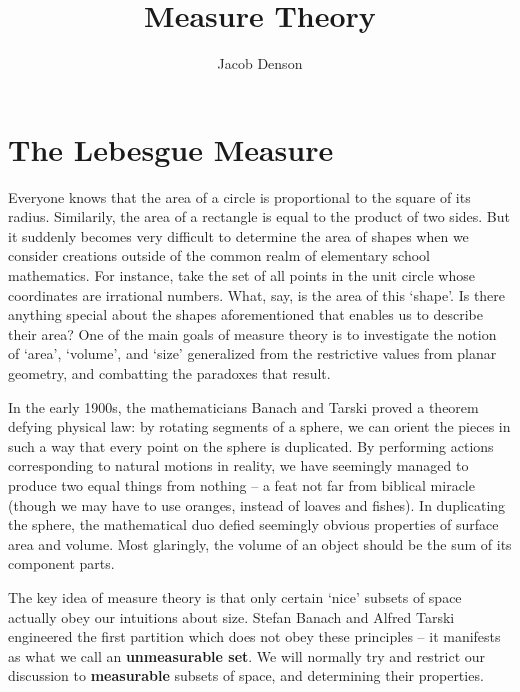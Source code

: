 

\title{Measure Theory}
\author{Jacob Denson}




\maketitle

\tableofcontents


\chapter{The Lebesgue Measure}

Everyone knows that the area of a circle is proportional to the square of its radius. Similarily, the area of a rectangle is equal to the product of two sides. But it suddenly becomes very difficult to determine the area of shapes when we consider creations outside of the common realm of elementary school mathematics. For instance, take the set of all points in the unit circle whose coordinates are irrational numbers. What, say, is the area of this `shape'. Is there anything special about the shapes aforementioned that enables us to describe their area? One of the main goals of measure theory is to investigate the notion of `area', `volume', and `size' generalized from the restrictive values from planar geometry, and combatting the paradoxes that result.

In the early 1900s, the mathematicians Banach and Tarski proved a theorem defying physical law: by rotating segments of a sphere, we can orient the pieces in such a way that every point on the sphere is duplicated. By performing actions corresponding to natural motions in reality, we have seemingly managed to produce two equal things from nothing -- a feat not far from biblical miracle (though we may have to use oranges, instead of loaves and fishes). In duplicating the sphere, the mathematical duo defied seemingly obvious properties of surface area and volume. Most glaringly, the volume of an object should be the sum of its component parts.

The key idea of measure theory is that only certain `nice' subsets of space actually obey our intuitions about size. Stefan Banach and Alfred Tarski engineered the first partition which does not obey these principles -- it manifests as what we call an {\bf unmeasurable set}. We will normally try and restrict our discussion to {\bf measurable} subsets of space, and determining their properties.

